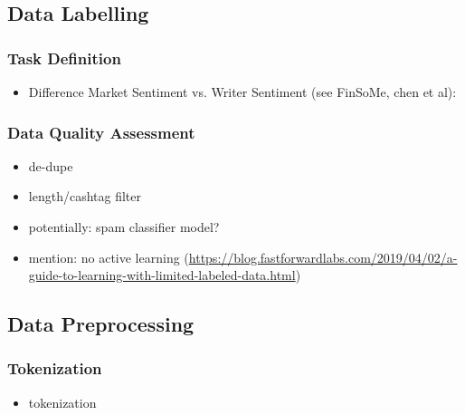 \subsection{Data Labelling}

\subsubsection{Task Definition}
\begin{itemize}[noitemsep]
	\item Difference Market Sentiment vs. Writer Sentiment (see FinSoMe, chen et al):
\end{itemize}




\subsubsection{Data Quality Assessment}  %
\begin{itemize}[noitemsep]
	\item de-dupe
	\item length/cashtag filter
	\item potentially: spam classifier model?
	\item mention: no active learning (\url{https://blog.fastforwardlabs.com/2019/04/02/a-guide-to-learning-with-limited-labeled-data.html})
\end{itemize}




\subsection{Data Preprocessing}
\label{section-data-preprocessing}
\subsubsection{Tokenization}
\begin{itemize}[noitemsep]
	\item tokenization
\end{itemize}

